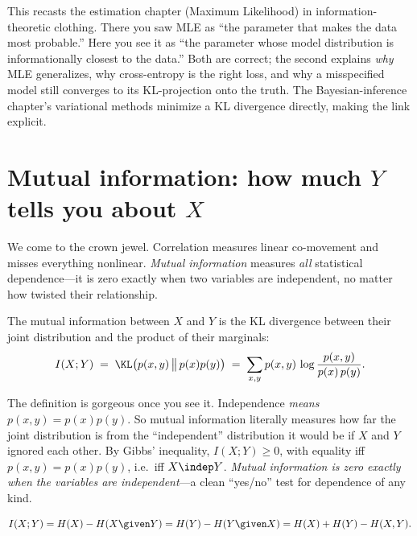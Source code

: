 \begin{connectionbox}
This recasts the estimation chapter (Maximum Likelihood) in information-theoretic clothing. There you saw
MLE as ``the parameter that makes the data most probable.'' Here you see it as ``the parameter whose model
distribution is informationally closest to the data.'' Both are correct; the second explains \emph{why}
MLE generalizes, why cross-entropy is the right loss, and why a misspecified model still converges to its
KL-projection onto the truth. The Bayesian-inference chapter's variational methods minimize a KL
divergence directly, making the link explicit.
\end{connectionbox}

\section{Mutual information: how much $Y$ tells you about $X$}
\label{ch33:mutual-info}

We come to the crown jewel. Correlation measures linear co-movement and misses everything nonlinear.
\emph{Mutual information} measures \emph{all} statistical dependence---it is zero exactly when two variables
are independent, no matter how twisted their relationship.

\begin{definition}
\label{ch33:def-mi}
The mutual information between $X$ and $Y$ is the KL divergence between their joint distribution and the
product of their marginals:
\[
  I(X; Y) \;=\; \KL\big(p(x,y) \,\big\|\, p(x)p(y)\big)
          \;=\; \sum_{x,y} p(x,y)\,\log\frac{p(x,y)}{p(x)\,p(y)}.
\]
\end{definition}

The definition is gorgeous once you see it. Independence \emph{means} $p(x,y) = p(x)p(y)$. So mutual
information literally measures how far the joint distribution is from the ``independent'' distribution
it would be if $X$ and $Y$ ignored each other. By Gibbs' inequality, $I(X;Y) \ge 0$, with equality iff
$p(x,y) = p(x)p(y)$, i.e.\ iff $X \indep Y$. \emph{Mutual information is zero exactly when the variables
are independent}---a clean ``yes/no'' test for dependence of any kind.

\begin{theorem}
\label{ch33:mi-entropy}
\[
  I(X;Y) = H(X) - H(X\given Y) = H(Y) - H(Y\given X) = H(X) + H(Y) - H(X,Y).
\]
\end{theorem}


